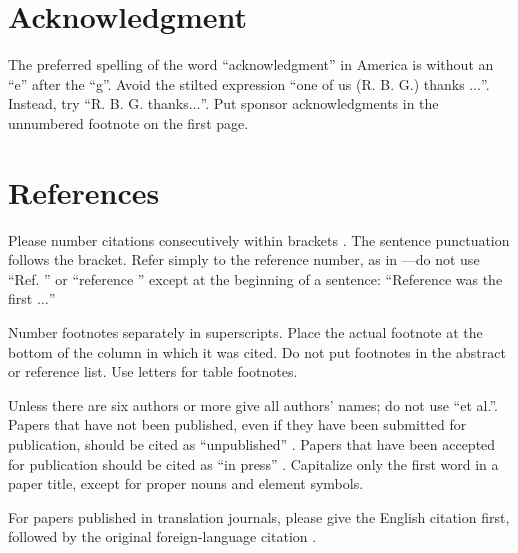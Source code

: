 \section*{Acknowledgment}
The preferred spelling of the word ``acknowledgment'' in America is without 
an ``e'' after the ``g''. Avoid the stilted expression ``one of us (R. B. 
G.) thanks $\ldots$''. Instead, try ``R. B. G. thanks$\ldots$''. Put sponsor 
acknowledgments in the unnumbered footnote on the first page.

\section*{References}
Please number citations consecutively within brackets \cite{c1}. The 
sentence punctuation follows the bracket\iffalse\cite{c2}\fi. Refer simply to the reference 
number, as in \cite{c3}---do not use ``Ref. \cite{c3}'' or ``reference \cite{c3}'' except at 
the beginning of a sentence: ``Reference \cite{c3} was the first $\ldots$''

Number footnotes separately in superscripts. Place the actual footnote at 
the bottom of the column in which it was cited. Do not put footnotes in the 
abstract or reference list. Use letters for table footnotes.

Unless there are six authors or more give all authors' names; do not use 
``et al.''. Papers that have not been published, even if they have been 
submitted for publication, should be cited as ``unpublished'' \cite{c4}. Papers 
that have been accepted for publication should be cited as ``in press'' \cite{c5}. 
Capitalize only the first word in a paper title, except for proper nouns and 
element symbols.

For papers published in translation journals, please give the English 
citation first, followed by the original foreign-language citation \cite{c6}.
